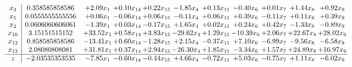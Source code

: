 \documentclass[9pt]{article}
\begin{document}
\[\begin{array}{c| c c@{\hskip 2pt} c@{\hskip 2pt} c@{\hskip 2pt} c@{\hskip 2pt} c@{\hskip 2pt} c@{\hskip 2pt} c@{\hskip 2pt} c@{\hskip 2pt} c@{\hskip 2pt} }
 x_{3}   &  0.358585858586 & +  2.09 x_{1} & +  0.10 x_{14} & +  0.22 x_{15} & -1.85 x_{4} & +  0.13 x_{11} & -0.40 x_{6} & +  0.01 x_{7} & +  1.44 x_{8} & +  0.92 x_{9}\\
 x_{5}   &  0.0555555555556 & +  0.06 x_{1} & -0.06 x_{14} & +  0.06 x_{15} & -0.11 x_{4} & +  0.06 x_{11} & +  0.39 x_{6} & -0.11 x_{7} & +  0.11 x_{8} & +  0.39 x_{9}\\
 x_{2}   &  0.0606060606061 & -1.39 x_{1} & +  0.03 x_{14} & -0.17 x_{15} & +  1.65 x_{4} & +  0.02 x_{11} & +  0.24 x_{6} & +  0.42 x_{7} & -1.33 x_{8} & -0.89 x_{9}\\
 x_{10}   &  3.15151515152 & + 33.52 x_{1} & +  0.58 x_{14} & +  3.83 x_{15} & -29.62 x_{4} & +  1.29 x_{11} & -10.39 x_{6} & +  2.06 x_{7} & + 22.67 x_{8} & + 28.02 x_{9}\\
 x_{12}   &  0.858585858586 & -13.41 x_{1} & +  0.60 x_{14} & -1.28 x_{15} & +  2.15 x_{4} & -0.37 x_{11} & +  7.10 x_{6} & -6.99 x_{7} & -9.56 x_{8} & -6.58 x_{9}\\
 x_{13}   &  2.08080808081 & + 31.81 x_{1} & +  0.37 x_{14} & +  2.94 x_{15} & -26.30 x_{4} & +  1.85 x_{11} & -3.34 x_{6} & +  1.57 x_{7} & + 24.89 x_{8} & + 16.97 x_{9}\\
\hline
z    &  -2.03535353535 & -7.85 x_{1} & -0.60 x_{14} & -0.44 x_{15} & +  4.66 x_{4} & -0.72 x_{11} & +  5.03 x_{6} & -0.75 x_{7} & +  1.11 x_{8} & -6.02 x_{9}\\
\end{array}\]
\end{document}
